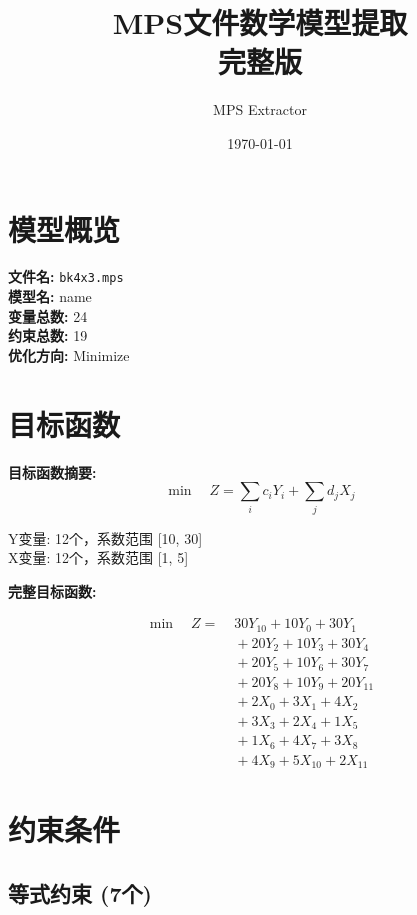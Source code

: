 \documentclass[a4paper,10pt]{article}
\title{MPS文件数学模型提取\\{\large 完整版}}
\author{MPS Extractor}
\date{\today}
\begin{document}
\maketitle
\tableofcontents
\newpage

\section{模型概览}

\textbf{文件名:} \texttt{bk4x3.mps} \\
\textbf{模型名:} name \\
\textbf{变量总数:} 24 \\
\textbf{约束总数:} 19 \\
\textbf{优化方向:} Minimize \\

\section{目标函数}

\textbf{目标函数摘要:}
\begin{equation}
\min \quad Z = \sum_{i} c_i Y_i + \sum_{j} d_j X_j
\end{equation}

Y变量: 12个，系数范围 [10, 30] \\
X变量: 12个，系数范围 [1, 5]

\textbf{完整目标函数:}

\allowdisplaybreaks
{\small
\begin{align}
\min \quad Z = &\; 30 Y_{10} + 10 Y_{0} + 30 Y_{1} \\[0.3ex]
&\;  + 20 Y_{2} + 10 Y_{3} + 30 Y_{4} \\[0.3ex]
&\;  + 20 Y_{5} + 10 Y_{6} + 30 Y_{7} \\[0.3ex]
&\;  + 20 Y_{8} + 10 Y_{9} + 20 Y_{11} \\[0.3ex]
&\;  + 2 X_{0} + 3 X_{1} + 4 X_{2} \\[0.3ex]
&\;  + 3 X_{3} + 2 X_{4} + 1 X_{5} \\[0.3ex]
&\;  + 1 X_{6} + 4 X_{7} + 3 X_{8} \\[0.3ex]
&\;  + 4 X_{9} + 5 X_{10} + 2 X_{11}\nonumber
\end{align}
}

\section{约束条件}

\subsection{等式约束 (7个)}
\end{document}
